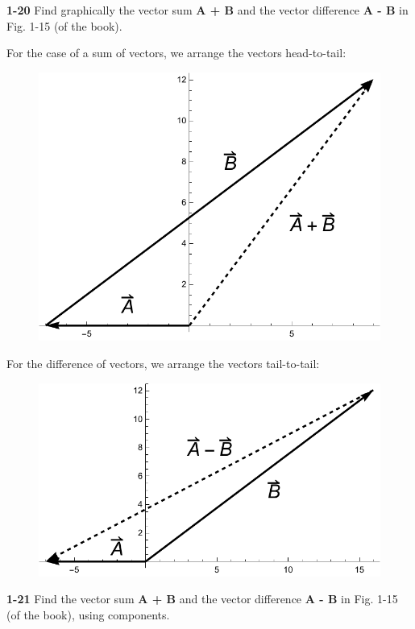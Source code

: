 \documentclass{amsart}
\begin{document}
\textbf{1-20} Find graphically the vector sum \textbf{A + B} and the vector difference \textbf{A - B} in Fig. 1-15 (of the book).

For the case of a sum of vectors, we arrange the vectors head-to-tail:

\begin{figure}[h]
\includegraphics[scale=0.32]{1-20a}
\end{figure}

For the difference of vectors, we arrange the vectors tail-to-tail:

\begin{figure}[h]
\includegraphics[scale=0.32]{1-20b}
\end{figure}

\textbf{1-21} Find the vector sum \textbf{A + B} and the vector difference \textbf{A - B} in Fig. 1-15 (of the book), using components.
\end{document}

